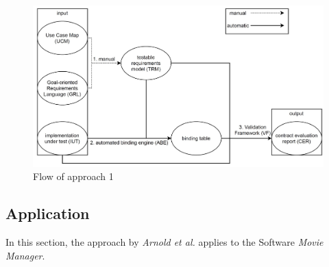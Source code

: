 \begin{figure}
	\centering
	\includegraphics[scale=0.4]{../images/08/08_controllFlow1.jpg} 
	\caption{Flow of approach 1}
	\label{fig:08_flowOf1}
\end{figure}

\newpage
\subsection{Application}
In this section, the approach by \textit{Arnold et al.} applies to the Software \textit{Movie Manager}.
